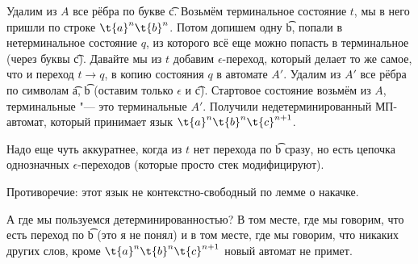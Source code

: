 	Удалим из $A$ все рёбра по букве \t{c}.
	Возьмём терминальное состояние $t$, мы в него пришли по строке $\t{a}^n\t{b}^n$.
	Потом допишем одну \t{b}, попали в нетерминальное состояние $q$, из которого всё еще можно попасть в терминальное (через буквы \t{c}).
	Давайте мы из $t$ добавим $\epsilon$-переход, который делает то же самое, что и переход $t \to q$, в копию состояния $q$ в автомате $A'$.
	Удалим из $A'$ все рёбра по символам \t{a}, \t{b} (оставим только $\epsilon$ и \t{c}).
	Стартовое состояние возьмём из $A$, терминальные "--- это терминальные $A'$.
	Получили недетерминированный МП-автомат, который принимает язык $\t{a}^n\t{b}^n\t{c}^{n+1}$.
	
	Надо еще чуть аккуратнее, когда из $t$ нет перехода по \t{b} сразу, но есть цепочка однозначных $\epsilon$-переходов (которые просто стек модифицируют).

	Противоречие: этот язык не контекстно-свободный по лемме о накачке.

	А где мы пользуемся детерминированностью?
	В том месте, где мы говорим, что есть переход по \t{b} (это я не понял)
	и в том месте, где мы говорим, что никаких других слов, кроме $\t{a}^n\t{b}^n\t{c}^{n+1}$ новый автомат не примет.
